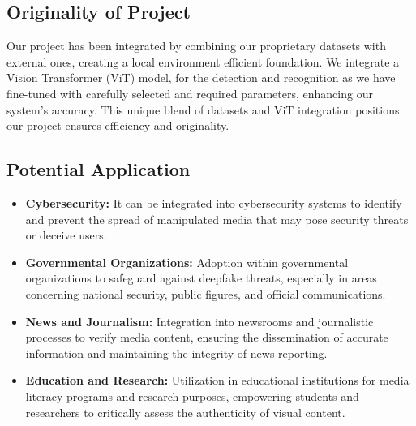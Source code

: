 \subsection{Originality of Project}
Our project has been integrated by combining our proprietary datasets with external ones, creating a local environment efficient foundation. We integrate a Vision Transformer (ViT) model, for the detection and recognition as we have fine-tuned with carefully selected and required parameters, enhancing our system's accuracy. This unique blend of datasets and ViT integration positions our project ensures efficiency and originality.\\
\subsection{Potential Application}

\begin{itemize}
    \item \textbf{Cybersecurity:} It can be integrated into cybersecurity systems to identify and prevent the spread of manipulated media that may pose security threats or deceive users.
    
    \item \textbf{Governmental Organizations:} Adoption within governmental organizations to safeguard against deepfake threats, especially in areas concerning national security, public figures, and official communications.
    
    \item \textbf{News and Journalism:} Integration into newsrooms and journalistic processes to verify media content, ensuring the dissemination of accurate information and maintaining the integrity of news reporting.
    
    \item \textbf{Education and Research:} Utilization in educational institutions for media literacy programs and research purposes, empowering students and researchers to critically assess the authenticity of visual content.
\end{itemize}
